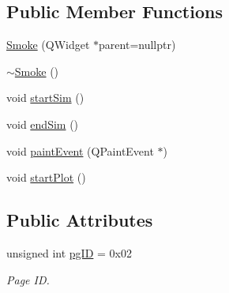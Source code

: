 \subsection*{Public Member Functions}
\begin{DoxyCompactItemize}
\item 
\mbox{\hyperlink{classSmoke_a37d4531eec55ecb9085bf7b1a6b03228}{Smoke}} (Q\+Widget $\ast$parent=nullptr)
\item 
\mbox{\hyperlink{classSmoke_a545ad6bf5610bf9bbe3e62967db1fff9}{$\sim$\+Smoke}} ()
\item 
void \mbox{\hyperlink{classSmoke_aca6f4c3a6e62bf27920229c5b53ae561}{start\+Sim}} ()
\item 
void \mbox{\hyperlink{classSmoke_a83d3a0d8bf172fcd6bc42ebf07f0f12f}{end\+Sim}} ()
\item 
void \mbox{\hyperlink{classSmoke_af00f430e6cbe30b6caf841d7d1b05890}{paint\+Event}} (Q\+Paint\+Event $\ast$)
\item 
void \mbox{\hyperlink{classSmoke_a989e6653d16bee5d83dc53e766a1eae7}{start\+Plot}} ()
\end{DoxyCompactItemize}
\subsection*{Public Attributes}
\begin{DoxyCompactItemize}
\item 
unsigned int \mbox{\hyperlink{classSmoke_a85ac4d6389daf0b33572436f18141397}{pg\+ID}} = 0x02
\begin{DoxyCompactList}\small\item\em Page ID. \end{DoxyCompactList}\end{DoxyCompactItemize}

